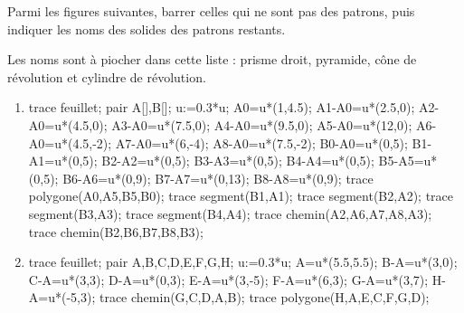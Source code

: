 \begin{exercice*}
    Parmi les figures suivantes, barrer celles qui ne sont pas des patrons, puis indiquer les noms des solides des patrons restants.

    Les noms sont à piocher dans cette liste : prisme droit, pyramide, cône de révolution et cylindre de révolution.

    \begin{minipage}{0.45\linewidth}
        \begin{enumerate}
            \item \phantom{rrr}
            
            \begin{Geometrie}[CoinHD={u*(4.5,4.5)}]
                trace feuillet;                
                pair A[],B[];
                u:=0.3*u;
                A0=u*(1,4.5);
                A1-A0=u*(2.5,0);
                A2-A0=u*(4.5,0);
                A3-A0=u*(7.5,0);
                A4-A0=u*(9.5,0);
                A5-A0=u*(12,0);
                A6-A0=u*(4.5,-2);
                A7-A0=u*(6,-4);
                A8-A0=u*(7.5,-2);
                B0-A0=u*(0,5);
                B1-A1=u*(0,5);
                B2-A2=u*(0,5);
                B3-A3=u*(0,5);
                B4-A4=u*(0,5);
                B5-A5=u*(0,5);
                B6-A6=u*(0,9);
                B7-A7=u*(0,13);
                B8-A8=u*(0,9);
                trace polygone(A0,A5,B5,B0);
                trace segment(B1,A1);
                trace segment(B2,A2);
                trace segment(B3,A3);
                trace segment(B4,A4);
                trace chemin(A2,A6,A7,A8,A3);
                trace chemin(B2,B6,B7,B8,B3);
            \end{Geometrie}

            \pointilles
            \item \phantom{rrr}
            
            \begin{Geometrie}[CoinHD={u*(4.5,4.5)}]
                trace feuillet;
                pair A,B,C,D,E,F,G,H;
                u:=0.3*u;
                A=u*(5.5,5.5);
                B-A=u*(3,0);
                C-A=u*(3,3);
                D-A=u*(0,3);
                E-A=u*(3,-5);
                F-A=u*(6,3);
                G-A=u*(3,7);
                H-A=u*(-5,3);
                trace chemin(G,C,D,A,B);
                trace polygone(H,A,E,C,F,G,D);                
            \end{Geometrie}


\end{enumerate}
\end{minipage}
\end{exercice*}
